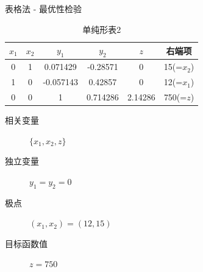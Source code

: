 \documentclass[mathserif, table]{beamer}
\begin{document}
\begin{frame}{表格法 - 最优性检验}

  \begin{table}
    \centering
    \begin{tabular}{|ccccc|c|}
      \hline
      $x_1$ & $x_2$ & $y_1$ & $y_2$ & $z$ & 右端项 \\
      \hline
      0 & 1 & 0.071429 & -0.28571 & 0 & 15(=$x_2$)\\
      1 & 0 & -0.057143 & 0.42857 & 0 & 12(=$x_1$)\\
      \hline
      0 & 0 & 1 & 0.714286 & 2.14286 & {\color{green}750(=$z$)}\\
      \hline
    \end{tabular}
    \caption{单纯形表2}
  \end{table}

  \begin{description}
  \item[相关变量] $\{x_1, x_2, z\}$
  \item[独立变量] $y_1=y_2=0$
  \item[极点] $(x_1, x_2) = (12, 15)$
  \item[目标函数值] $z = 750$
  \end{description}

\end{frame}
\end{document}
